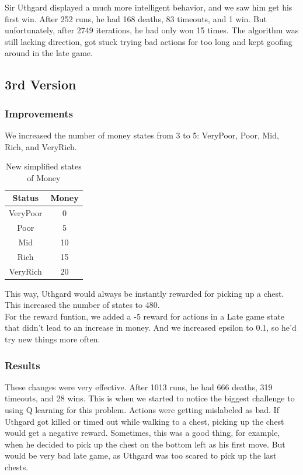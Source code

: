 \documentclass{article}
\begin{document}
  Sir Uthgard displayed a much more intelligent behavior, and we saw him get his first win. After 252 runs, he had 168 deaths, 83 timeouts, and 1 win. 
  But unfortunately, after 2749 iterations, he had only won 15 times. The algorithm was still lacking direction, got stuck trying bad actions for too long and kept goofing around in the late game.

  \subsection{3rd Version}

  \subsubsection{Improvements}

  We increased the number of money states from 3 to 5: VeryPoor, Poor, Mid, Rich, and VeryRich. 
  
  \begin{table}[h!]
    \centering
    \caption{New simplified states of Money}
    \label{tab:moneyStates2}
    \begin{tabular}{c|c}
      \textbf{Status} & \textbf{Money}\\
      \hline
      VeryPoor & 0\\
      Poor & 5\\
      Mid & 10\\
      Rich &  15\\
      VeryRich & 20\\
    \end{tabular}
  \end{table}
  \noindent
  This way, Uthgard would always be instantly rewarded for picking up a chest. This increased the number of states to 480. \\
  For the reward funtion, we added a -5 reward for actions in a Late game state that didn't lead to an increase in money. And we increased epsilon to 0.1, so he'd try new things more often.

  \subsubsection{Results}

  These changes were very effective. After 1013 runs, he had 666 deaths, 319 timeouts, and 28 wins. This is when we started to notice the biggest challenge to using Q learning for this problem. 
  Actions were getting mislabeled as bad. If Uthgard got killed or timed out while walking to a chest, picking up the chest would get a negative reward. 
  Sometimes, this was a good thing, for example, when he decided to pick up the chest on the bottom left as his first move. But would be very bad late game, as Uthgard was too scared to pick up the last chests.
\end{document}
